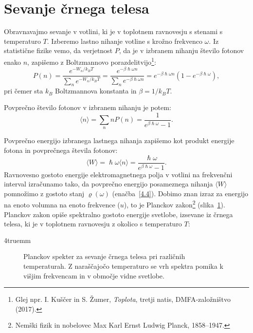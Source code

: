 \section{Sevanje črnega telesa}
Obravnavajmo sevanje v votlini, ki je v toplotnem ravnovesju s stenami s temperaturo
$T$. Izberemo lastno nihanje votline s krožno frekvenco $\omega$. Iz statistične fizike 
vemo, da verjetnost $P$, da je v izbranem  nihanju število fotonov enako $n$, 
zapišemo z Boltzmannovo porazdelitvijo\footnote{Glej
npr. I. Kuščer in S. Žumer, {\it Toplota}, tretji natis, DMFA-založništvo (2017).}:
\begin{equation}
P(n)=\frac{e^{-W_{n}/k_BT}}{\sum_{n}e^{-W_{n}/k_BT}} = 
\frac{e^{-\beta\hslash\omega n}}
{\sum_{n}e^{-\beta\hslash\omega n}}=
e^{-\beta\hslash\omega n}\left(1-e^{-\beta\hslash\omega}\right)\!\!,
\label{4.12}
\end{equation}
pri čemer sta $k_B$ Boltzmannova konstanta in $\beta = 1/k_BT$. 

Povprečno število fotonov v izbranem nihanju je potem:
\begin{equation}
\langle n\rangle =\sum_{n}n P(n)=\frac{1}{e^{\beta\hslash\omega}-1}.
\label{4.13}
\end{equation}

Povprečno energijo izbranega lastnega nihanja zapišemo kot produkt energije fotona in 
povprečnega števila fotonov:
\begin{equation}
\langle W\rangle = \hslash \omega \langle n \rangle
= \frac{\hslash \omega}{e^{\beta\hslash\omega}-1}.
\end{equation}
Ravnovesno gostoto energije elektromagnetnega polja v votlini na
frekvenčni interval izračunamo tako, da povprečno energijo posameznega
nihanja $\langle W \rangle$ pomnožimo z gostoto stanj $\varrho (\omega)$ 
(enačba~\ref{4.4}). Dobimo znan izraz za energijo na enoto volumna na enoto frekvence ($u$), 
to je Planckov zakon\footnote{Nemški fizik in nobelovec 
Max Karl Ernst Ludwig Planck, 1858--1947.} (slika~\ref{fig:Planck}).
Planckov zakon opiše spektralno gostoto energije  
svetlobe, izsevane iz 
črnega telesa, ki je v toplotnem 
ravnovesju z okolico s temperaturo $T$:

\vglue4truemm
\begin{figure}[ht]
\centering
\def\svgwidth{90truemm} 

\caption{Planckov spekter za sevanje črnega telesa pri različnih temperaturah. 
Z naraščajočo temperaturo se vrh spektra pomika k višjim frekvencam in 
v območje vidne svetlobe.}
\label{fig:Planck}
\end{figure}

